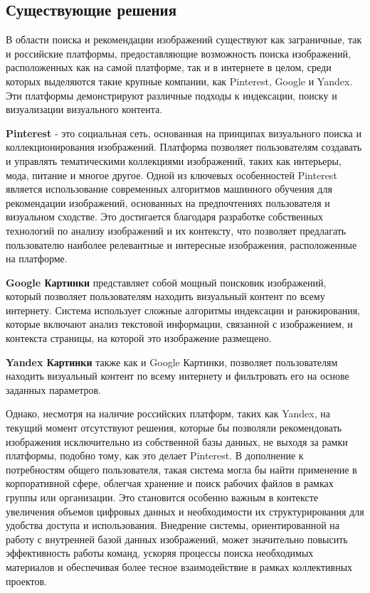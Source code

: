 \subsection{Существующие решения}
В области поиска и рекомендации изображений существуют как заграничные, так и российские платформы, предоставляющие возможность поиска изображений, расположенных как на самой платформе, так и в интернете в целом, среди которых выделяются такие крупные компании, как Pinterest, Google и Yandex. Эти платформы демонстрируют различные подходы к индексации, поиску и визуализации визуального контента.

\textbf{Pinterest} - это социальная сеть, основанная на принципах визуального поиска и коллекционирования изображений. Платформа позволяет пользователям создавать и управлять тематическими коллекциями изображений, таких как интерьеры, мода, питание и многое другое. Одной из ключевых особенностей Pinterest является использование современных алгоритмов машинного обучения для рекомендации изображений, основанных на предпочтениях пользователя и визуальном сходстве. Это достигается благодаря разработке собственных технологий по анализу изображений и их контексту, что позволяет предлагать пользователю наиболее релевантные и интересные изображения, расположенные на платформе.

\textbf{Google Картинки} представляет собой мощный поисковик изображений, который позволяет пользователям находить визуальный контент по всему интернету. Система использует сложные алгоритмы индексации и ранжирования, которые включают анализ текстовой информации, связанной с изображением, и контекста страницы, на которой это изображение размещено.

\textbf{Yandex Картинки} также как и Google Картинки, позволяет пользователям находить визуальный контент по всему интернету и фильтровать его на основе заданных параметров. 

Однако, несмотря на наличие российских платформ, таких как Yandex, на текущий момент отсутствуют решения, которые бы позволяли рекомендовать изображения исключительно из собственной базы данных, не выходя за рамки платформы, подобно тому, как это делает Pinterest. В дополнение к потребностям общего пользователя, такая система могла бы найти применение в корпоративной сфере, облегчая хранение и поиск рабочих файлов в рамках группы или организации. Это становится особенно важным в контексте увеличения объемов цифровых данных и необходимости их структурирования для удобства доступа и использования. Внедрение системы, ориентированной на работу с внутренней базой данных изображений, может значительно повысить эффективность работы команд, ускоряя процессы поиска необходимых материалов и обеспечивая более тесное взаимодействие в рамках коллективных проектов.
